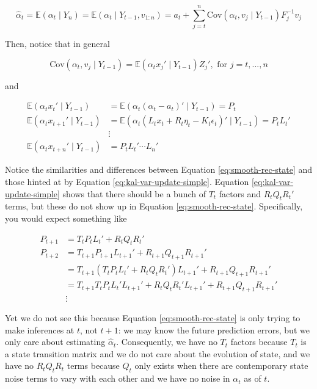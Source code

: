 \documentclass{tufte-book}
\begin{document}
\[
\hat{\alpha}_t = \mathbb{E}(\alpha_t \mid Y_n) = \mathbb{E}(\alpha_t \mid Y_{t-1}, v_{1:n}) =  a_t + \sum_{j=t}^n \text{Cov}(\alpha_t, v_j \mid Y_{t-1})F_j^{-1} v_j
\]

\noindent Then, notice that in general

\[
\text{Cov}(\alpha_t, v_j \mid Y_{t-1}) = \mathbb{E}(\alpha_t x_j' \mid Y_{t-1})Z_j', \text{ for } j=t, ..., n
\]

\noindent and

\begin{align}
\mathbb{E}(\alpha_t x_t' \mid Y_{t-1}) &= \mathbb{E}(\alpha_t (\alpha_t - a_t)' \mid Y_{t-1}) = P_t \nonumber \\
\mathbb{E}(\alpha_t x_{t+1}' \mid Y_{t-1}) &= \mathbb{E}(\alpha_t (L_t x_t + R_t \eta_t - K_t \epsilon_t)' \mid Y_{t-1}) = P_t L_t' \nonumber \\
&\vdots \nonumber \\
\mathbb{E}(\alpha_t x_{t+n}' \mid Y_{t-1}) &= P_t L_t' \cdots L_n' \label{eq:smooth-rec-state}
\end{align}

\noindent Notice the similarities and differences between Equation \ref{eq:smooth-rec-state} and those hinted at by Equation \ref{eq:kal-var-update-simple}. Equation \ref{eq:kal-var-update-simple} shows that there should be a bunch of $T_t$ factors and $R_t Q_t R_t'$ terms, but these do not show up in Equation \ref{eq:smooth-rec-state}. Specifically, you would expect something like

\begin{align*}
P_{t+1} &= T_t P_t L_t' + R_t Q_t R_t' \\
P_{t+2} &= T_{t+1} P_{t+1} L_{t+1}' + R_{t+1} Q_{t+1} R_{t+1}' \\
&= T_{t+1} (T_t P_t L_t' + R_t Q_t R_t') L_{t+1}' + R_{t+1} Q_{t+1} R_{t+1}' \\
&= T_{t+1} T_t P_t L_t' L_{t+1}' + R_t Q_t R_t' L_{t+1}' + R_{t+1} Q_{t+1} R_{t+1}' \\
&\vdots
\end{align*}

\noindent Yet we do not see this because Equation \ref{eq:smooth-rec-state} is only trying to make inferences at $t$, not $t+1$: we may know the future prediction errors, but we only care about estimating $\hat{\alpha}_t$. Consequently, we have no $T_t$ factors because $T_t$ is a state transition matrix and we do not care about the evolution of state, and we have no $R_t Q_t R_t$ terms because $Q_t$ only exists when there are contemporary state noise terms to vary with each other and we have no noise in $\alpha_t$ as of $t$.
\end{document}

